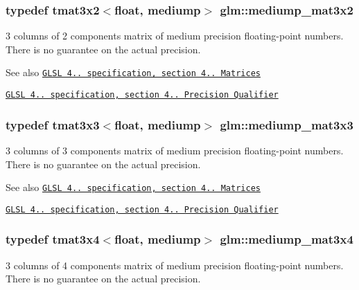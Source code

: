 \subsubsection[{mediump\+\_\+mat3x2}]{\setlength{\rightskip}{0pt plus 5cm}typedef tmat3x2$<$float, mediump$>$ {\bf glm\+::mediump\+\_\+mat3x2}}\label{namespaceglm_a12af91dfb7d3e26a5d69ca855b3f575f}
3 columns of 2 components matrix of medium precision floating-\/point numbers. There is no guarantee on the actual precision.

\begin{DoxySeeAlso}{See also}
\href{http://www.opengl.org/registry/doc/GLSLangSpec.4.20.8.pdf}{\tt G\+L\+S\+L 4.. specification, section 4.. Matrices} 

\href{http://www.opengl.org/registry/doc/GLSLangSpec.4.20.8.pdf}{\tt G\+L\+S\+L 4.. specification, section 4.. Precision Qualifier} 
\end{DoxySeeAlso}
\hypertarget{namespaceglm_a70f5a956774bf9e5dd2b9ce0ead37d59}{}
\subsubsection[{mediump\+\_\+mat3x3}]{\setlength{\rightskip}{0pt plus 5cm}typedef tmat3x3$<$float, mediump$>$ {\bf glm\+::mediump\+\_\+mat3x3}}\label{namespaceglm_a70f5a956774bf9e5dd2b9ce0ead37d59}
3 columns of 3 components matrix of medium precision floating-\/point numbers. There is no guarantee on the actual precision.

\begin{DoxySeeAlso}{See also}
\href{http://www.opengl.org/registry/doc/GLSLangSpec.4.20.8.pdf}{\tt G\+L\+S\+L 4.. specification, section 4.. Matrices} 

\href{http://www.opengl.org/registry/doc/GLSLangSpec.4.20.8.pdf}{\tt G\+L\+S\+L 4.. specification, section 4.. Precision Qualifier} 
\end{DoxySeeAlso}
\hypertarget{namespaceglm_a9fb2492cd6d05a3f7c8fad76eacd8bcf}{}
\subsubsection[{mediump\+\_\+mat3x4}]{\setlength{\rightskip}{0pt plus 5cm}typedef tmat3x4$<$float, mediump$>$ {\bf glm\+::mediump\+\_\+mat3x4}}\label{namespaceglm_a9fb2492cd6d05a3f7c8fad76eacd8bcf}
3 columns of 4 components matrix of medium precision floating-\/point numbers. There is no guarantee on the actual precision.

